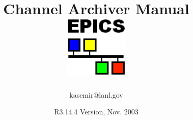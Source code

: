 \documentclass{report}
\begin{document}
\sffamily
\title{\Huge Channel Archiver Manual\\[1cm]
\includegraphics[width=3cm]{logo101}
}
\date{R3.14.4 Version, Nov. 2003}
\author{kasemir@lanl.gov}
\maketitle

\tableofcontents

\pagestyle{headings}




\printindex
\end{document}
